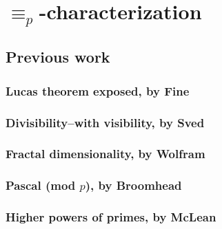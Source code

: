 
\chapter{$\equiv_{p}$-characterization}
\label{ch:modular:characterization}

\section{Previous work}
\subsection{Lucas theorem exposed, by Fine}
\subsection{Divisibility--with visibility, by Sved}
\subsection{Fractal dimensionality, by Wolfram}
\subsection{Pascal (mod $p$), by Broomhead}
\subsection{Higher powers of primes, by McLean}




